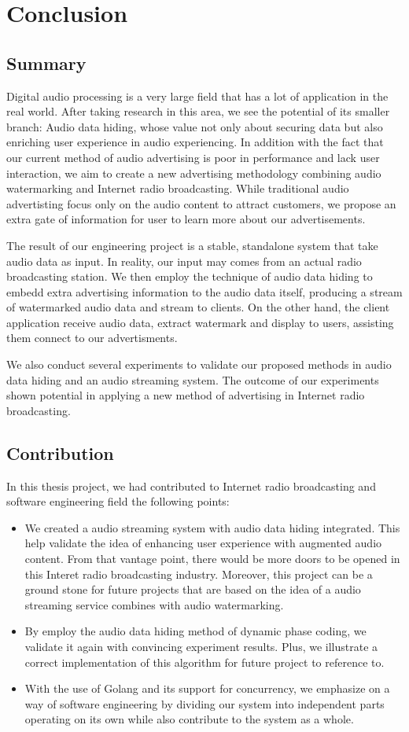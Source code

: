 \chapter{Conclusion}
\section{Summary}
Digital audio processing is a very large field that has a lot of application in the real world. After taking research in this area, we see the potential of its smaller branch: Audio data hiding, whose value not only about securing data but also enriching user experience in audio experiencing. In addition with the fact that our current method of audio advertising is poor in performance and lack user interaction, we aim to create a new advertising methodology combining audio watermarking and Internet radio broadcasting. While traditional audio advertisting focus only on the audio content to attract customers, we propose an extra gate of information for user to learn more about our advertisements. 

The result of our engineering project is a stable, standalone system that take audio data as input. In reality, our input may comes from an actual radio broadcasting station. We then employ the technique of audio data hiding to embedd extra advertising information to the audio data itself, producing a stream of watermarked audio data and stream to clients. On the other hand, the client application receive audio data, extract watermark and display to users, assisting them connect to our advertisments. 

We also conduct several experiments to validate our proposed methods in audio data hiding and an audio streaming system. The outcome of our experiments shown potential in applying a new method of advertising in Internet radio broadcasting.

\section{Contribution}
In this thesis project, we had contributed to Internet radio broadcasting and software engineering field the following points:
\begin{itemize}
\item{} We created a audio streaming system with audio data hiding integrated. This help validate the idea of enhancing user experience with augmented audio content. From that vantage point, there would be more doors to be opened in this Interet radio broadcasting industry. Moreover, this project can be a ground stone for future projects that are based on the idea of a audio streaming service combines with audio watermarking.
\item{} By employ the audio data hiding method of dynamic phase coding, we validate it again with convincing experiment results. Plus, we illustrate a correct implementation of this algorithm for future project to reference to.
\item{} With the use of Golang and its support for concurrency, we emphasize on a way of software engineering by dividing our system into independent parts operating on its own while also contribute to the system as a whole.
\end{itemize}

